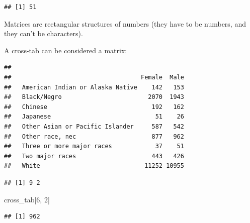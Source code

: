 \documentclass[
]{book}
\newenvironment{Shaded}{\begin{snugshade}}{\end{snugshade}}
\newcommand{\DecValTok}[1]{\textcolor[rgb]{0.00,0.00,0.81}{#1}}
\newcommand{\KeywordTok}[1]{\textcolor[rgb]{0.13,0.29,0.53}{\textbf{#1}}}
\newcommand{\NormalTok}[1]{#1}
\newcommand{\OperatorTok}[1]{\textcolor[rgb]{0.81,0.36,0.00}{\textbf{#1}}}
\newcommand{\StringTok}[1]{\textcolor[rgb]{0.31,0.60,0.02}{#1}}
\theoremstyle{definition}
\theoremstyle{definition}
\theoremstyle{definition}
\theoremstyle{remark}
\begin{document}
\begin{verbatim}
## [1] 51
\end{verbatim}

Matrices are rectangular structures of numbers (they have to be numbers, and they can't be characters).

A cross-tab can be considered a matrix:

\begin{Shaded}
\end{Shaded}

\begin{verbatim}
##                                   
##                                    Female  Male
##   American Indian or Alaska Native    142   153
##   Black/Negro                        2070  1943
##   Chinese                             192   162
##   Japanese                             51    26
##   Other Asian or Pacific Islander     587   542
##   Other race, nec                     877   962
##   Three or more major races            37    51
##   Two major races                     443   426
##   White                             11252 10955
\end{verbatim}

\begin{Shaded}
\end{Shaded}

\begin{verbatim}
## [1] 9 2
\end{verbatim}

\begin{Shaded}
\begin{Highlighting}[]
\NormalTok{cross\_tab[}\DecValTok{6}\NormalTok{, }\DecValTok{2}\NormalTok{]}
\end{Highlighting}
\end{Shaded}

\begin{verbatim}
## [1] 962
\end{verbatim}
\end{document}
